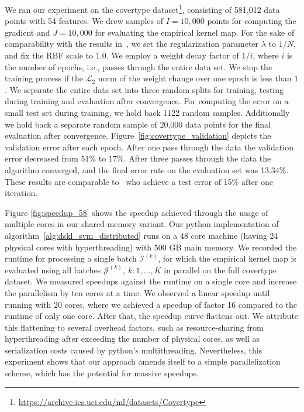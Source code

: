 \documentclass{article} %
\begin{document}
We ran our experiment on the covertype dataset\footnote{\url{https://archive.ics.uci.edu/ml/datasets/Covertype}}, consisting of 581,012 data points with 54 features. We drew samples of $I=10,000$ points for computing the gradient and $J=10,000$ for evaluating the empirical kernel map. For the sake of comparability with the results in~\cite{Dai2014}, we set the regularization parameter $\lambda$ to $1 / N$, and fix the RBF scale to $1.0$. We employ a weight decay factor of $1/i$, where $i$ is the number of epochs, i.e., passes through the entire data set. We stop the training process if the $\mathcal{L}_{2}$ norm of the weight change over one epoch is less than $1$. We separate the entire data set into three random splits for training, testing during training and evaluation after convergence. For computing the error on a small test set during training, we hold back 1122 random samples. Additionally we hold back a separate random sample of 20,000 data points for the final evaluation after convergence. Figure~\ref{fig:covertype_validation} depicts the validation error after each epoch. After one pass through the data the validation error decreased from 51\% to 17\%. After three passes through the data the algorithm converged, and the final error rate on the evaluation set was 13.34\%. These results are comparable to~\cite{Dai2014} who achieve a test error of 15\% after one iteration. 

Figure \ref{fig:speedup_58} shows the speedup achieved through the usage of multiple cores in our shared-memory variant. 
Our python implementation of algorithm~\autoref{alg:dskl_svm_distributed} runs on a 48 core machine (having 24 physical cores with hyperthreading) with 500 GB main memory. 
We recorded the runtime for processing a single batch $\mathcal{I}^{(k)}$, for which the empirical kernel map is evaluated using all batches $\mathcal{J}^{(k)},~k: 1,\dots,K$ in parallel on the full covertype dataset. We measured speedups against the runtime on a single core and increase the parallelism by ten cores at a time.  We observed a linear speedup until running with 20 cores, where we achieved a speedup of factor 16 compared to the runtime of only one core. After that, the speedup curve flattens out. We attribute this flattening to several overhead factors, such as resource-sharing from hyperthreading after exceeding the number of physical cores, as well as serialization costs caused by python's multithreading. Nevertheless, this experiment shows that our approach amends itself to a simple parallelization scheme, which has the potential for massive speedups.
\end{document}
